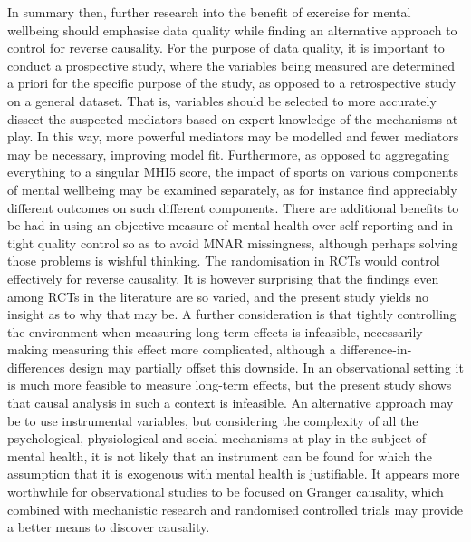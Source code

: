 In summary then, further research into the benefit of exercise for mental wellbeing should emphasise data quality
while finding an alternative approach to control for reverse causality.
For the purpose of data quality, it is important to conduct a prospective study, where the variables being measured
are determined a priori for the specific purpose of the study, as opposed to a retrospective study on a general dataset.
That is, variables should be selected to more accurately dissect the suspected mediators based on expert knowledge
of the mechanisms at play. In this way, more powerful mediators may be modelled and fewer mediators may be necessary,
improving model fit.
Furthermore, as opposed to aggregating everything to a singular MHI5 score,
the impact of sports on various components of mental wellbeing may be examined separately, as for instance
 find appreciably different outcomes on such different components.
There are additional benefits to be had in using an objective measure of mental health over self-reporting and in
tight quality control so as to avoid MNAR missingness, although perhaps solving those problems is wishful thinking.
The randomisation in RCTs would control effectively for reverse causality. It is however surprising that
the findings even among RCTs in the literature are so varied, and the present study yields no insight as to why that may be.
A further consideration is that tightly controlling the environment when measuring long-term effects is infeasible,
necessarily making measuring this effect more complicated, although a difference-in-differences design may partially
offset this downside.
In an observational setting it is much more feasible to measure long-term effects, but the present study shows
that causal analysis in such a context is infeasible. An alternative approach may be to use instrumental variables,
but considering the complexity of all the psychological, physiological and social mechanisms at play in the subject of
mental health, it is not likely that an instrument can be found for which the assumption that it is exogenous
with mental health is justifiable.
It appears more worthwhile for observational studies to be focused on Granger causality, which combined with
mechanistic research and randomised controlled trials may provide a better means to discover causality.
